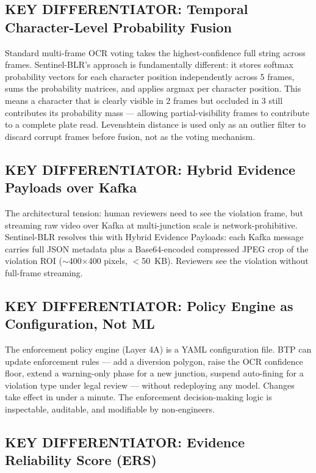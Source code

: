 \documentclass[11pt,a4paper]{article}
\begin{document}
\subsection*{KEY DIFFERENTIATOR: Temporal Character-Level Probability Fusion}

Standard multi-frame OCR voting takes the highest-confidence full string across frames. Sentinel-BLR's approach is fundamentally different: it stores softmax probability vectors for each character position independently across 5 frames, sums the probability matrices, and applies argmax per character position. This means a character that is clearly visible in 2 frames but occluded in 3 still contributes its probability mass — allowing partial-visibility frames to contribute to a complete plate read. Levenshtein distance is used only as an outlier filter to discard corrupt frames before fusion, not as the voting mechanism.

\subsection*{KEY DIFFERENTIATOR: Hybrid Evidence Payloads over Kafka}

The architectural tension: human reviewers need to see the violation frame, but streaming raw video over Kafka at multi-junction scale is network-prohibitive. Sentinel-BLR resolves this with Hybrid Evidence Payloads: each Kafka message carries full JSON metadata plus a Base64-encoded compressed JPEG crop of the violation ROI ($\sim$400$\times$400 pixels, $<$50~KB). Reviewers see the violation without full-frame streaming.

\subsection*{KEY DIFFERENTIATOR: Policy Engine as Configuration, Not ML}

The enforcement policy engine (Layer 4A) is a YAML configuration file. BTP can update enforcement rules — add a diversion polygon, raise the OCR confidence floor, extend a warning-only phase for a new junction, suspend auto-fining for a violation type under legal review — without redeploying any model. Changes take effect in under a minute. The enforcement decision-making logic is inspectable, auditable, and modifiable by non-engineers.

\subsection*{KEY DIFFERENTIATOR: Evidence Reliability Score (ERS)}
\end{document}
